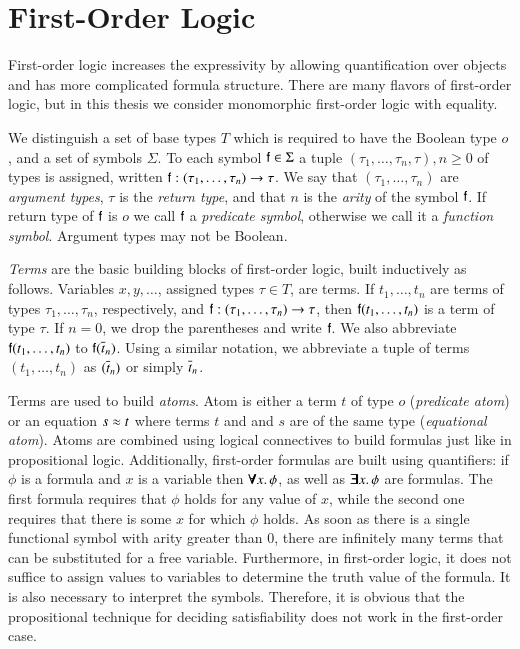 \section{First-Order Logic}

First-order logic increases the expressivity by allowing quantification over
objects and has more complicated formula structure. There are many flavors of
first-order logic, but in this thesis we consider monomorphic first-order logic
with equality.

We distinguish a set of base types $T$ which is required to have the Boolean
type $o$, and a set of symbols $\Sigma$. To each symbol $\mathsf{f} \in \Sigma$ a
tuple $(\tau_1, \ldots, \tau_{n}, \tau), n \geq 0$ of types is assigned, written
$\mathsf{f} : (\tau_1, \ldots, \tau_{n}) \rightarrow \tau$. We say that $(\tau_1,
\ldots, \tau_{n})$ are \emph{argument types}, $\tau$ is the \emph{return type}, and that $n$
is the \emph{arity} of the symbol $\mathsf{f}$. If return type of $\mathsf{f}$ is $o$ we call
$\mathsf{f}$ a \emph{predicate symbol}, otherwise we call it a \emph{function symbol}. Argument types may not be Boolean.

\emph{Terms} are the basic building blocks of first-order logic, built inductively as follows. Variables
$x,y,\ldots$, assigned types $\tau \in T$, are terms. If $t_1,\ldots,t_n$ are
terms of types $\tau_1, \ldots, \tau_n$, respectively, and $\mathsf{f} : (\tau_1,
\ldots, \tau_{n}) \rightarrow \tau$, then $\mathsf{f}(t_1, \ldots, t_n)$ is a term
of type $\tau$. If $n=0$, we drop the parentheses and write $\mathsf{f}$. We also
abbreviate $\mathsf{f}(t_1, \ldots, t_n)$ to $\mathsf{f}(\overline{t}_{n})$. Using a similar
notation, we abbreviate a tuple of terms $(t_1, \ldots, t_n)$ as $(\overline{t}_{n})$
or simply $\overline{t}_{n}$.

Terms are used to build \emph{atoms}. Atom is either a term $t$ of type $o$ (\emph{predicate atom}) or an
equation $s \approx t$ where terms $t$ and and $s$ are of the same type (\emph{equational atom}). Atoms are
combined using logical connectives to build formulas just like in propositional
logic. Additionally, first-order formulas are built using quantifiers: if $\phi$
is a formula and $x$ is a variable then $\pmb\forall x.\, \phi$, as well as
$\pmb\exists x.\, \phi$ are formulas. The first formula requires that $\phi$ holds
for any value of $x$, while the second one requires that there is some $x$ for
which $\phi$ holds. As soon as there is a single functional symbol with arity
greater than 0, there are infinitely many terms that can be substituted for a
free variable. Furthermore, in first-order logic, it does not suffice to assign
values to variables to determine the truth value of the formula. It is also
necessary to interpret the symbols. Therefore, it is obvious that the propositional
technique for deciding satisfiability does not work in the first-order case.

